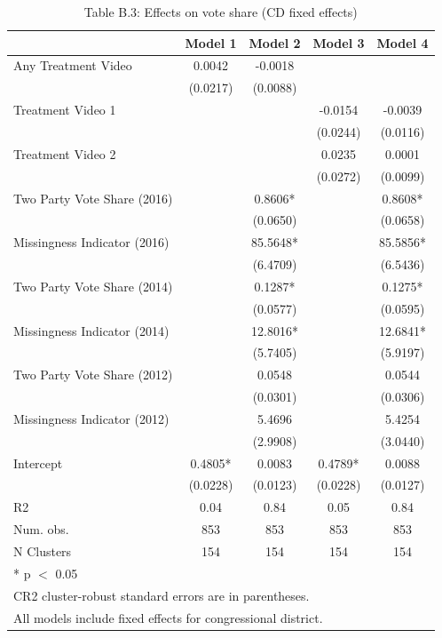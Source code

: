 \begin{table}
\centering
\caption{Table B.3: Effects on vote share (CD fixed effects)}
\centering
\begin{tabular}[t]{lcccc}
\toprule
  & Model 1 & Model 2 & Model 3 & Model 4\\
\midrule
Any Treatment Video & 0.0042 & -0.0018 &  & \\
 & (0.0217) & (0.0088) &  & \\
Treatment Video 1 &  &  & -0.0154 & -0.0039\\
 &  &  & (0.0244) & (0.0116)\\
Treatment Video 2 &  &  & 0.0235 & 0.0001\\
 &  &  & (0.0272) & (0.0099)\\
Two Party Vote Share (2016) &  & 0.8606* &  & 0.8608*\\
 &  & (0.0650) &  & (0.0658)\\
Missingness Indicator (2016) &  & 85.5648* &  & 85.5856*\\
 &  & (6.4709) &  & (6.5436)\\
Two Party Vote Share (2014) &  & 0.1287* &  & 0.1275*\\
 &  & (0.0577) &  & (0.0595)\\
Missingness Indicator (2014) &  & 12.8016* &  & 12.6841*\\
 &  & (5.7405) &  & (5.9197)\\
Two Party Vote Share (2012) &  & 0.0548 &  & 0.0544\\
 &  & (0.0301) &  & (0.0306)\\
Missingness Indicator (2012) &  & 5.4696 &  & 5.4254\\
 &  & (2.9908) &  & (3.0440)\\
Intercept & 0.4805* & 0.0083 & 0.4789* & 0.0088\\
 & (0.0228) & (0.0123) & (0.0228) & (0.0127)\\
\midrule
R2 & 0.04 & 0.84 & 0.05 & 0.84\\
Num. obs. & 853 & 853 & 853 & 853\\
N Clusters & 154 & 154 & 154 & 154\\
\bottomrule
\multicolumn{5}{l}{\rule{0pt}{1em}* p $<$ 0.05}\\
\multicolumn{5}{l}{\rule{0pt}{1em}CR2 cluster-robust standard errors are in parentheses.}\\
\multicolumn{5}{l}{\rule{0pt}{1em}All models include fixed effects for congressional district.}\\
\end{tabular}
\end{table}
